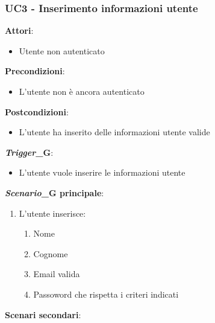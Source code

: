 \subsubsection{UC3 - Inserimento informazioni utente}\label{usecase:3}
\textbf{Attori}: 
\begin{itemize}
    \item Utente non autenticato
\end{itemize}
\textbf{Precondizioni}:
\begin{itemize}
    \item L'utente non è ancora autenticato
\end{itemize}
\textbf{Postcondizioni}: 
\begin{itemize}
    \item L'utente ha inserito delle informazioni utente valide
\end{itemize}
\textbf{\textit{Trigger}_G}:
\begin{itemize}
    \item L'utente vuole inserire le informazioni utente
\end{itemize}
\textbf{\textit{Scenario}_G principale}:
\begin{enumerate}
    \item L'utente inserisce:
    \begin{enumerate}
        \item Nome
        \item Cognome
        \item Email valida %
        \item Passoword che rispetta i criteri indicati %
    \end{enumerate}
\end{enumerate}
\textbf{Scenari secondari}:
